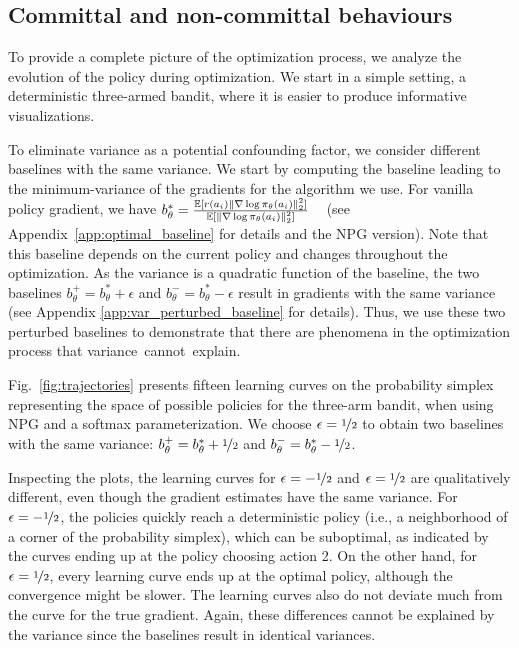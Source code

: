 \subsection{Committal and non-committal behaviours}

To provide a complete picture of the optimization process, we analyze the evolution of the policy during optimization.
We start in a simple setting, a deterministic three-armed bandit, where it is easier to produce informative visualizations. 

To eliminate variance as a potential confounding factor, we consider different baselines with the same variance. We start by computing the baseline leading to the minimum-variance of the gradients for the algorithm we use. For vanilla policy gradient, we have $b^*_\theta = \frac{\mathbb{E}[r(a_i) \|\nabla \log \pi_\theta (a_i)\|^2_2 ] }{\mathbb{E}[ \|\nabla \log \pi_\theta (a_i) \|^2_2] } $ ~\citep{peters2008reinforcement, greensmith2004variance} (see Appendix~\ref{app:optimal_baseline} for details and the NPG version). Note that this baseline depends on the current policy and changes throughout the optimization. As the variance is a quadratic function of the baseline, the two baselines $b^+_\theta = b^*_\theta + \epsilon$ and $b^-_\theta = b^*_\theta - \epsilon$ result in gradients with the same variance (see Appendix \ref{app:var_perturbed_baseline} for details). Thus, we use these two perturbed baselines to demonstrate that there are phenomena in the optimization process that variance~cannot~explain.

Fig.~\ref{fig:trajectories} presents fifteen learning curves on the probability simplex representing the space of possible policies for the three-arm bandit, when using NPG and a softmax parameterization. We choose $\epsilon = \nicefrac{1}{2}$ to obtain two baselines with the same variance: $b^+_\theta = b^*_\theta + \nicefrac{1}{2}$ and $b^-_\theta = b^*_\theta - \nicefrac{1}{2}$.

Inspecting the plots, the learning curves for $\epsilon = -\nicefrac{1}{2}$ and $\epsilon = \nicefrac{1}{2}$ are qualitatively different, even though the gradient estimates have the same variance. For $\epsilon = -\nicefrac{1}{2}$, the policies quickly reach a deterministic policy (i.e., a neighborhood of a corner of the probability simplex), which can be suboptimal, as indicated by the curves ending up at the policy choosing action 2. On the other hand, for $\epsilon=\nicefrac{1}{2}$, every learning curve ends up at the optimal policy, although the convergence might be slower. The learning curves also do not deviate much from the curve for the true gradient. 
Again, these differences cannot be explained by the variance since the baselines result in identical variances. 


